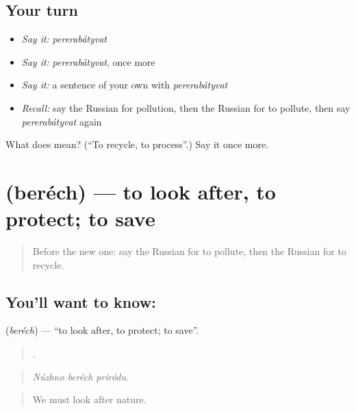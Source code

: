 \subsection*{Your turn}
\begin{itemize}
\raggedright
  \item \emph{Say it:} \emph{pererabátyvat}
  \item \emph{Say it:} \emph{pererabátyvat}, once more
  \item \emph{Say it:} a sentence of your own with \emph{pererabátyvat}
  \item \emph{Recall:} say the Russian for pollution, then the Russian for to pollute, then say \emph{pererabátyvat} again
\end{itemize}

\begin{tcolorbox}[breakable,colback=teal!4,colframe=teal!35!black,title={Before you move on}]
What does  mean? (\textquotedblleft{}To recycle, to process\textquotedblright{}.) Say it once more.
\end{tcolorbox}
\section[\texorpdfstring{\ru{беречь} (beréch)}{беречь (beréch)}]{ (beréch) — to look after, to protect; to save}

\label{lesson:RU-C369-berech}



\begin{quote}
Before the new one: say the Russian for to pollute, then the Russian for to recycle.
\end{quote}

\subsection*{You'll want to know: }
\textbf{} (\emph{beréch}) — \textquotedblleft{}to look after, to protect; to save\textquotedblright{}.

\begin{quote}
  .
\end{quote}

\begin{quote}
\emph{Núzhno beréch priródu.}
\end{quote}

\begin{quote}
We must look after nature.
\end{quote}

